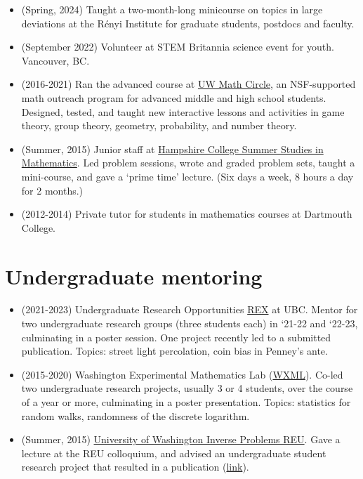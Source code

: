 \documentclass[letterpaper]{article}
\begin{document}
\begin{itemize} 
  \item (Spring, 2024) Taught a two-month-long minicourse on topics in large deviations at the Rényi Institute for graduate students, postdocs and faculty. 
  \item (September 2022) Volunteer at STEM Britannia science event for youth. Vancouver, BC.
    \item (2016-2021) Ran the advanced course at \href{https://www.math.washington.edu/~mathcircle/circle/}{UW Math Circle,} an NSF-supported math outreach program for advanced middle and high school students. Designed, tested, and taught new interactive lessons and activities in game theory, group theory, geometry, probability, and number theory. 
  \item (Summer, 2015) Junior staff at \href{http://www.hcssim.org/}{Hampshire College Summer Studies in Mathematics}. Led problem sessions, wrote and graded problem sets, taught a mini-course, and gave a `prime time' lecture. (Six days a week, 8 hours a day for 2 months.)
  \item (2012-2014) Private tutor for students in mathematics courses at Dartmouth College.

\end{itemize}


\section*{Undergraduate mentoring}

\begin{itemize}
  \item (2021-2023) Undergraduate Research Opportunities \href{https://www.uroubc.com/}{REX} at UBC. Mentor for two undergraduate research groups (three students each) in `21-22 and `22-23, culminating in a poster session. One project recently led to a submitted publication. Topics: street light percolation, coin bias in Penney's ante.
  
  \item (2015-2020) Washington Experimental Mathematics Lab (\href{https://www.wxml.math.washington.edu/}{WXML}). Co-led two undergraduate research projects, usually 3 or 4 students, over the course of a year or more, culminating in a poster presentation. Topics: statistics for random walks, randomness of the discrete logarithm. 

  \item (Summer, 2015) \href{https://www.math.washington.edu/~reu/index.html}{University of Washington Inverse Problems REU}. Gave a lecture at the REU colloquium, and advised an undergraduate student research project that resulted in a publication (\href{https://www.math.washington.edu/~reu/papers/2015/natalie/natalie.pdf}{link}). 

\end{itemize}
\end{document}
